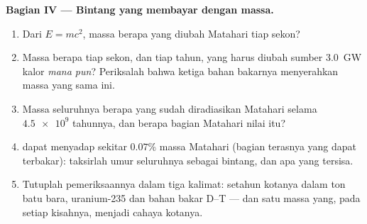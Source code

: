 \begin{problem}
\medskip
\noindent\textbf{Bagian IV --- Bintang yang membayar dengan massa.}
\begin{enumerate}[resume]
  \item Dari $E = mc^2$, massa berapa yang diubah Matahari tiap sekon?
  \item Massa berapa tiap sekon, dan tiap tahun, yang harus diubah sumber
        \qty{3.0}{GW} kalor \emph{mana pun}? Periksalah bahwa ketiga bahan bakarnya
        menyerahkan massa yang sama ini.
  \item Massa seluruhnya berapa yang sudah diradiasikan Matahari selama $\num{4.5e9}$
        tahunnya, dan berapa bagian Matahari nilai itu?
  \item {} dapat menyadap sekitar $0.07\%$ massa Matahari (bagian terasnya yang dapat
        terbakar): taksirlah umur seluruhnya sebagai bintang, dan apa yang tersisa.
  \item Tutuplah pemeriksaannya dalam tiga kalimat: setahun kotanya dalam ton
        batu bara,  uranium-235 dan  bahan bakar D--T --- dan
        satu  massa yang, pada setiap kisahnya, menjadi cahaya kotanya.
\end{enumerate}
\end{problem}
